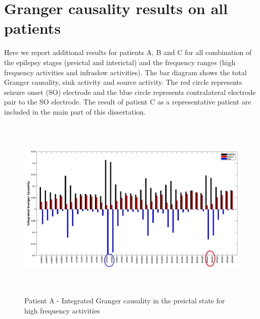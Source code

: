 \chapter{Granger causality results on all patients}
\label{chapter:appendix-gc-results}
Here we report additional results for patients A, B and C for all combination of the epilepsy stages (preictal and interictal) and the frequency ranges (high frequency activities and infraslow activities). The bar diagram shows the total Granger causality, sink activity and source activity. The red circle represents seizure onset (SO) electrode and the blue circle represents contralateral electrode pair to the SO electrode. 
The result of patient C as a representative patient are included in the main part of this dissertation. 


\begin{figure}
\centerline{
	\includegraphics[height =3.5in]{Plots/Patient_A_preictal_high.jpg}
	}

	\caption{Patient A - Integrated Granger causality in the preictal state for high frequency activities}

	\label{fig:apdx_patient_a_preictal_high}
\end{figure}


